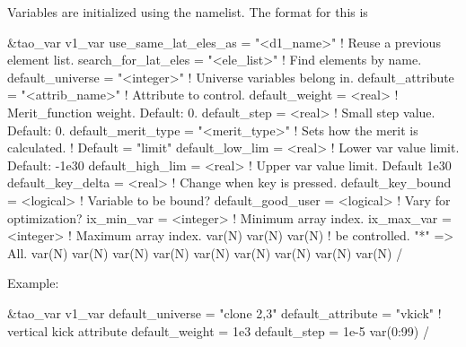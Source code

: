 {{{{{{{{{{{Variables are initialized using the  namelist. The format for this is
\begin{example}
  &tao_var
    v1_var%
    use_same_lat_eles_as = "<d1_name>"     ! Reuse a previous element list.
    search_for_lat_eles  = "<ele_list>"    ! Find elements by name.
    default_universe     = "<integer>"     ! Universe variables belong in.
    default_attribute    = "<attrib_name>" ! Attribute to control.
    default_weight       = <real>          ! Merit_function weight. Default: 0.
    default_step         = <real>          ! Small step value. Default: 0.
    default_merit_type   = "<merit_type>"  ! Sets how the merit is calculated.
                                           !   Default = "limit"
    default_low_lim      = <real>          ! Lower var value limit. Default: -1e30
    default_high_lim     = <real>          ! Upper var value limit. Default 1e30
    default_key_delta    = <real>          ! Change when key is pressed.
    default_key_bound    = <logical>       ! Variable  to be bound?
    default_good_user    = <logical>       ! Vary for optimization?
    ix_min_var           = <integer>       ! Minimum array index.
    ix_max_var           = <integer>       ! Maximum array index.
    var(N)%
    var(N)%
    var(N)%
                                           !    be controlled. "*" => All.
    var(N)%
    var(N)%
    var(N)%
    var(N)%
    var(N)%
    var(N)%
    var(N)%
    var(N)%
    var(N)%
  /
\end{example}
Example:
\begin{example}
  &tao_var
    v1_var%
    default_universe  = "clone 2,3"
    default_attribute = "vkick"     ! vertical kick attribute
    default_weight    = 1e3
    default_step      = 1e-5
    var(0:99)%
  /
\end{example}

}}}}}}}}}}}
